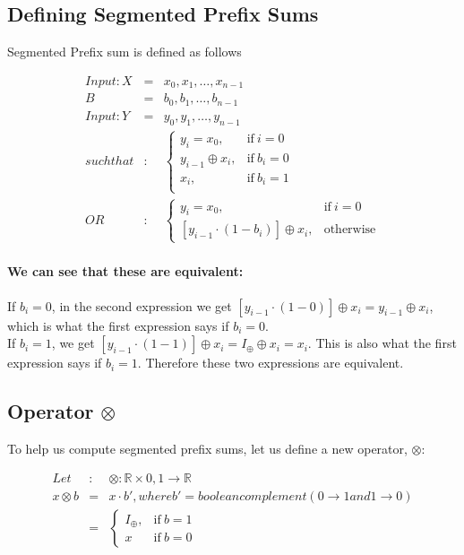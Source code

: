 \documentclass[11pt]{article}
\begin{document}
\subsection{Defining Segmented Prefix Sums}

Segmented Prefix sum is defined as follows

  \begin{eqnarray*}
    Input: X &=& {x_0, x_1, \dots , x_{n-1}}\\
    B &=& {b_0, b_1, \dots , b_{n-1}}\\
    Input: Y &=& {y_0, y_1, \dots , y_{n-1}}\\
    such that&:&
    \begin{cases}
      y_i = x_0, & \text{if}\ i = 0 \\
      y_{i-1} \oplus x_i, & \text{if}\ b_i = 0 \\
      x_i, & \text{if}\ b_i = 1 \\
    \end{cases}
    \\OR &:&
    \begin{cases}
      y_i = x_0, & \text{if}\ i = 0 \\
      [y_{i-1} \cdot (1 - b_i) ] \oplus x_i, & \text{otherwise}
    \end{cases}
  \end{eqnarray*}

\paragraph{We can see that these are equivalent:} 

If $b_i = 0$, in the second expression we get $[y_{i-1} \cdot (1-0)] \oplus x_i = y_{i-1} \oplus x_i$, which is what the first expression says if $b_i = 0$.\\
If $b_i = 1$, we get $[y_{i-1} \cdot (1 - 1)] \oplus x_i = I_\oplus \oplus x_i = x_i$. This is also what the first expression says if $b_i = 1$. Therefore these two expressions are equivalent.

\subsection{Operator $\otimes$} 
To help us compute segmented prefix sums, let us define a new operator, $\otimes$:

  \begin{eqnarray*}
    Let&:& \otimes: \mathbb{R} \times {0, 1} \longrightarrow \mathbb{R}\\
    x \otimes b &=& x \cdot b', where b' = boolean complement (0 \longrightarrow 1 and 1 \longrightarrow 0)\\
    &=&
    \begin{cases}
      I_\oplus, & \text{if}\ b = 1 \\
      x & \text{if}\ b = 0
    \end{cases}
  \end{eqnarray*}
\end{document}

